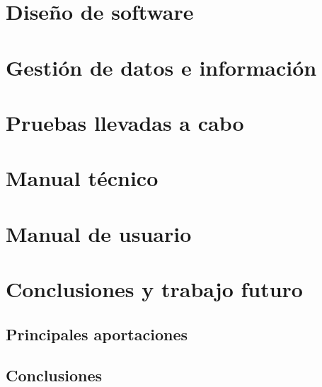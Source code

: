 \documentclass{article}
\begin{document}
\section{Diseño de software}


\section{Gestión de datos e información}


\section{Pruebas llevadas a cabo}




\section{Manual técnico}


\section{Manual de usuario}




\section{Conclusiones y trabajo futuro}


    \subsection{Principales aportaciones}




    \subsection{Conclusiones}
\end{document}
